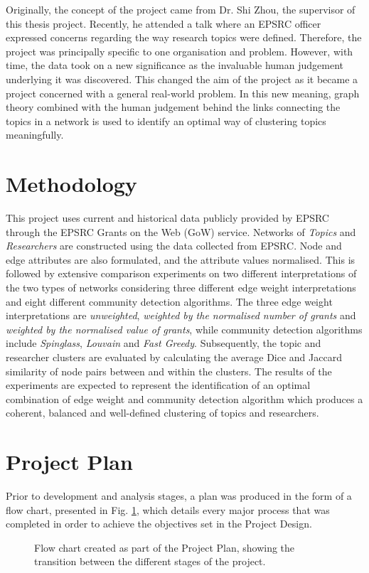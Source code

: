 Originally, the concept of the project came from Dr. Shi Zhou, the supervisor of this thesis project. Recently, he attended a talk where an EPSRC officer expressed concerns regarding the way research topics were defined. Therefore, the project was principally specific to one organisation and problem. However, with time, the data took on a new significance as the invaluable human judgement underlying it was discovered. This changed the aim of the project as it became a project concerned with a general real-world problem. In this new meaning, graph theory combined with the human judgement behind the links connecting the topics in a network is used to identify an optimal way of clustering topics meaningfully. 

\section{Methodology}

This project uses current and historical data publicly provided by EPSRC through the EPSRC Grants on the Web (GoW) service. Networks of \textit{Topics} and \textit{Researchers} are constructed using the data collected from EPSRC. Node and edge attributes are also formulated, and the attribute values normalised. This is followed by extensive comparison experiments on two different interpretations of the two types of networks considering three different edge weight interpretations and eight different community detection algorithms. The three edge weight interpretations are \textit{unweighted}, \textit{weighted by the normalised number of grants} and \textit{weighted by the normalised value of grants}, while community detection algorithms include \textit{Spinglass}, \textit{Louvain} and \textit{Fast Greedy}. Subsequently, the topic and researcher clusters are evaluated by calculating the average Dice and Jaccard similarity of node pairs between and within the clusters. The results of the experiments are expected to represent the identification of an optimal combination of edge weight and community detection algorithm which produces a coherent, balanced and well-defined clustering of topics and researchers.

\clearpage

\section{Project Plan}

Prior to development and analysis stages, a plan was produced in the form of a flow chart, presented in Fig. \ref{fig:flow_chart}, which details every major process that was completed in order to achieve the objectives set in the Project Design.

\begin{figure}[htpb]
    \centering
    \caption{Flow chart created as part of the Project Plan, showing the transition between the different stages of the project.}
    \label{fig:flow_chart}
\end{figure}

\clearpage